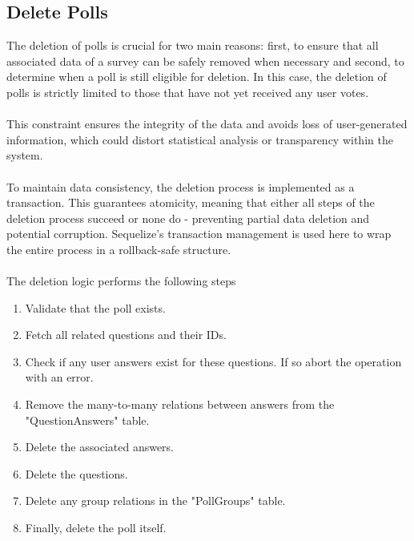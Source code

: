 \documentclass[a4paper,12pt]{report}
\begin{document}
\subsection{Delete Polls}
The deletion of polls is crucial for two main reasons: first, to ensure that all associated data of a survey can be safely removed when necessary and second, to determine when a poll is still eligible for deletion. In this case, the deletion of polls is strictly limited to those that have not yet received any user votes. \\ \\
This constraint ensures the integrity of the data and avoids loss of user-generated information, which could distort statistical analysis or transparency within the system.\\ \\
To maintain data consistency, the deletion process is implemented as a transaction. This guarantees atomicity, meaning that either all steps of the deletion process succeed or none do - preventing partial data deletion and potential corruption. Sequelize's transaction management is used here to wrap the entire process in a rollback-safe structure. \parencite{sequelizedoku}

\paragraph{}
The deletion logic performs the following steps
\begin{enumerate}
	\item Validate that the poll exists.
	\item Fetch all related questions and their IDs.
	\item Check if any user answers exist for these questions. If so abort the operation with an error.
	\item Remove the many-to-many relations between answers from the "QuestionAnswers" table.
	\item Delete the associated answers.
	\item Delete the questions.
	\item Delete any group relations in the "PollGroups" table.
	\item Finally, delete the poll itself.
\end{enumerate}
\end{document}
